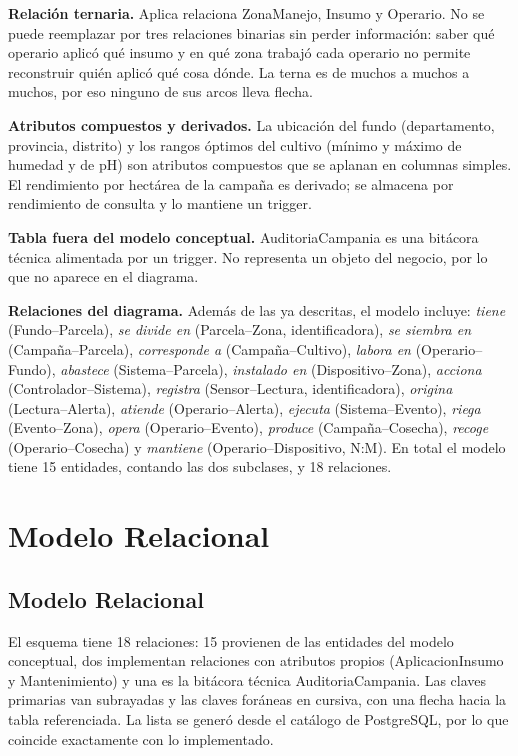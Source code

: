 \documentclass[11pt,letterpaper]{article}
\newcommand{\tbus}{\textunderscore\allowbreak}
\newcommand{\tb}[1]{{\ttfamily\let\_\tbus #1}}
\begin{document}
\textbf{Relación ternaria.} \tb{Aplica} relaciona \tb{Zona\_Manejo}, \tb{Insumo} y \tb{Operario}. No se puede reemplazar por tres relaciones binarias sin perder información: saber qué operario aplicó qué insumo y en qué zona trabajó cada operario no permite reconstruir quién aplicó qué cosa dónde. La terna es de muchos a muchos a muchos, por eso ninguno de sus arcos lleva flecha.

\textbf{Atributos compuestos y derivados.} La ubicación del fundo (departamento, provincia, distrito) y los rangos óptimos del cultivo (mínimo y máximo de humedad y de pH) son atributos compuestos que se aplanan en columnas simples. El rendimiento por hectárea de la campaña es derivado; se almacena por rendimiento de consulta y lo mantiene un trigger.

\textbf{Tabla fuera del modelo conceptual.} \tb{Auditoria\_Campania} es una bitácora técnica alimentada por un trigger. No representa un objeto del negocio, por lo que no aparece en el diagrama.

\textbf{Relaciones del diagrama.} Además de las ya descritas, el modelo incluye: \emph{tiene} (Fundo--Parcela), \emph{se divide en} (Parcela--Zona, identificadora), \emph{se siembra en} (Campaña--Parcela), \emph{corresponde a} (Campaña--Cultivo), \emph{labora en} (Operario--Fundo), \emph{abastece} (Sistema--Parcela), \emph{instalado en} (Dispositivo--Zona), \emph{acciona} (Controlador--Sistema), \emph{registra} (Sensor--Lectura, identificadora), \emph{origina} (Lectura--Alerta), \emph{atiende} (Operario--Alerta), \emph{ejecuta} (Sistema--Evento), \emph{riega} (Evento--Zona), \emph{opera} (Operario--Evento), \emph{produce} (Campaña--Cosecha), \emph{recoge} (Operario--Cosecha) y \emph{mantiene} (Operario--Dispositivo, N:M). En total el modelo tiene 15 entidades, contando las dos subclases, y 18 relaciones.

\section{Modelo Relacional}

\subsection{Modelo Relacional}

El esquema tiene 18 relaciones: 15 provienen de las entidades del modelo conceptual, dos implementan relaciones con atributos propios (\tb{Aplicacion\_Insumo} y \tb{Mantenimiento}) y una es la bitácora técnica \tb{Auditoria\_Campania}. Las claves primarias van subrayadas y las claves foráneas en cursiva, con una flecha hacia la tabla referenciada. La lista se generó desde el catálogo de PostgreSQL, por lo que coincide exactamente con lo implementado.
\end{document}

